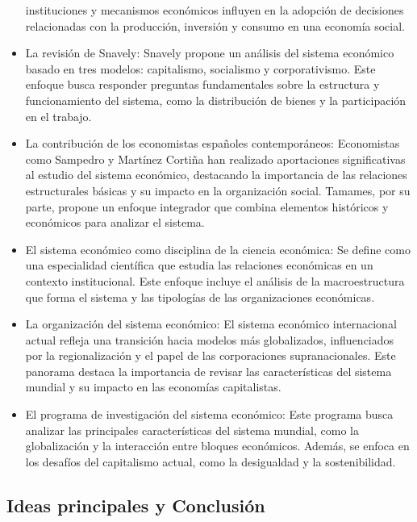 \documentclass[12pt]{report} %
\begin{document}
\begin{itemize}
  instituciones y mecanismos económicos influyen en la adopción de
  decisiones relacionadas con la producción, inversión y consumo en una
  economía social.
\item
  La revisión de Snavely: Snavely propone un análisis del sistema
  económico basado en tres modelos: capitalismo, socialismo y
  corporativismo. Este enfoque busca responder preguntas fundamentales
  sobre la estructura y funcionamiento del sistema, como la distribución
  de bienes y la participación en el trabajo.
\item
  La contribución de los economistas españoles contemporáneos:
  Economistas como Sampedro y Martínez Cortiña han realizado
  aportaciones significativas al estudio del sistema económico,
  destacando la importancia de las relaciones estructurales básicas y su
  impacto en la organización social. Tamames, por su parte, propone un
  enfoque integrador que combina elementos históricos y económicos para
  analizar el sistema.
\item
  El sistema económico como disciplina de la ciencia económica: Se
  define como una especialidad científica que estudia las relaciones
  económicas en un contexto institucional. Este enfoque incluye el
  análisis de la macroestructura que forma el sistema y las tipologías
  de las organizaciones económicas.
\item
  La organización del sistema económico: El sistema económico
  internacional actual refleja una transición hacia modelos más
  globalizados, influenciados por la regionalización y el papel de las
  corporaciones supranacionales. Este panorama destaca la importancia de
  revisar las características del sistema mundial y su impacto en las
  economías capitalistas.
\item
  El programa de investigación del sistema económico: Este programa
  busca analizar las principales características del sistema mundial,
  como la globalización y la interacción entre bloques económicos.
  Además, se enfoca en los desafíos del capitalismo actual, como la
  desigualdad y la sostenibilidad.
\end{itemize}

\hypertarget{ideas-principales-y-conclusiuxf3n}{%
\subsection{Ideas principales y
Conclusión}\label{ideas-principales-y-conclusiuxf3n}}
\end{document}
